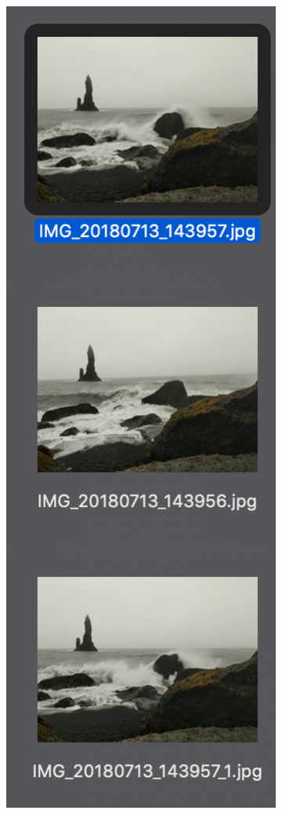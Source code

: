 \documentclass[12pt]{article}
\begin{document}
\begin{figure}[H]
\begin{subfigure}[b]{.3\textwidth}
		\includegraphics[width=.7\textwidth]{images/correct_match_3.png}
	\end{subfigure}%
	~
	\begin{subfigure}[b]{.3\textwidth}

\end{subfigure}
\end{figure}
\end{document}
